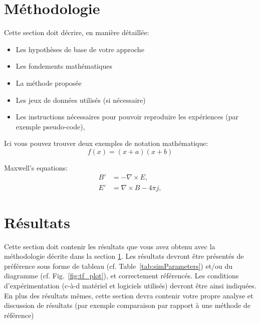 \documentclass[journal, a4paper]{IEEEtran}
\begin{document}
\section{Méthodologie}\label{sec:met}
	Cette section doit décrire, en manière détaillée:
	\begin{itemize}
	\item Les hypothèses de base de votre approche
	\item Les fondements mathématiques
	\item La méthode proposée
	\item Les jeux de données utilisés (si nécessaire)
	\item Les instructions nécessaires pour pouvoir reproduire les expériences (par exemple pseudo-code), 
	\end{itemize}
	
	Ici vous pouvez trouver deux exemples de notation mathématique:
	\begin{equation} 
	 f(x)=(x+a)(x+b)
	\end{equation}

	Maxwell's equations:
\begin{align}
        B'&=-\nabla \times E,\\
        E'&=\nabla \times B - 4\pi j,
\end{align}

\section{Résultats}
	Cette section doit contenir les résultats que vous avez obtenu avec la méthodologie décrite dans la section \ref{sec:met}.
	Les résultats devront être présentés de préférence sous forme de tableau (cf. Table~\ref{tab:simParameters}) et/ou du diagramme (cf. Fig.~\ref{fig:tf_plot}), et correctement référencés.
	Les conditions d'expérimentation (c-à-d matériel et logiciels utilisés) devront être ainsi indiquées.
	En plus des résultats mêmes, cette section devra contenir votre propre analyse et discussion de résultats (par exemple comparaison par rapport à une méthode de référence)
\end{document}
